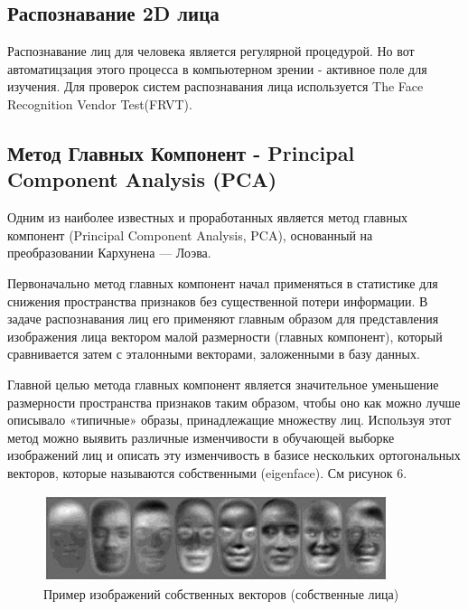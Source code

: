 \documentclass[12pt,a4paper]{article}					%
\begin{document}

\subsection{Распознавание 2D лица}

Распознавание лиц для человека является регулярной процедурой.
Но вот автоматицзация этого процесса в компьютерном зрении - активное поле для изучения.
Для проверок систем распознавания лица используется The Face Recognition Vendor Test(FRVT).



\subsection{Метод Главных Компонент - Principal Component Analysis (PCA) }

Одним из наиболее известных и проработанных является метод главных компонент (Principal Component Analysis, PCA), основанный на преобразовании Кархунена — Лоэва. 

Первоначально метод главных компонент начал применяться в статистике для снижения пространства признаков без существенной потери информации. 
В задаче распознавания лиц его применяют главным образом для представления изображения лица вектором малой размерности (главных компонент), который сравнивается затем с эталонными векторами, заложенными в базу данных. 

Главной целью метода главных компонент является значительное уменьшение размерности пространства признаков таким образом, чтобы оно как можно лучше описывало «типичные» образы, принадлежащие множеству лиц. 
Используя этот метод можно выявить различные изменчивости в обучающей выборке изображений лиц и описать эту изменчивость в базисе нескольких ортогональных векторов, которые называются собственными (eigenface). См рисунок 6.

\begin{figure}[h!]
\centering
\includegraphics[scale=1.0]{res/pca_faces}
\caption{Пример изображений собственных векторов (собственные лица)}
\end{figure}
\end{document}
